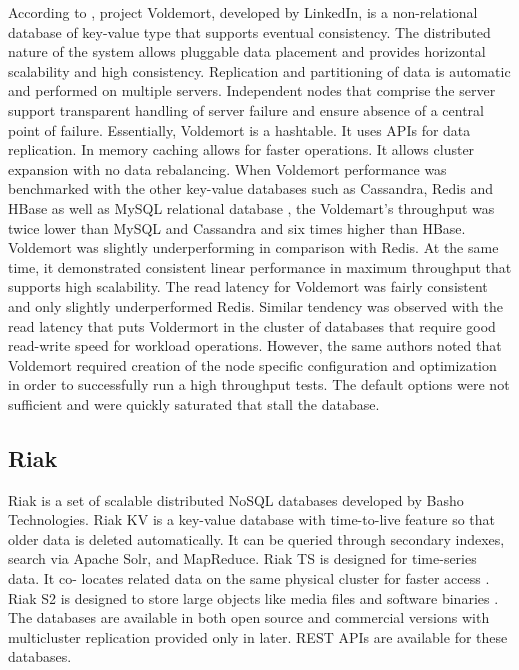     According to \cite{www-voldemort}, project Voldemort, developed
     by LinkedIn, is a non-relational database of key-value type that
     supports eventual consistency. The distributed nature of the
     system allows pluggable data placement and provides horizontal
     scalability and high consistency. Replication and partitioning of
     data is automatic and performed on multiple servers. Independent
     nodes that comprise the server support transparent handling of
     server failure and ensure absence of a central point of
     failure. Essentially, Voldemort is a hashtable. It uses APIs for
     data replication. In memory caching allows for faster
     operations. It allows cluster expansion with no data rebalancing.
     When Voldemort performance was benchmarked with the other
     key-value databases such as Cassandra, Redis and HBase as well as
     MySQL relational database \cite{rabl-sadoghi-jacobsen-2012}, the
     Voldemart's throughput was twice lower than MySQL and Cassandra
     and six times higher than HBase. Voldemort was slightly
     underperforming in comparison with Redis. At the same time, it
     demonstrated consistent linear performance in maximum throughput
     that supports high scalability. The read latency for Voldemort
     was fairly consistent and only slightly underperformed
     Redis. Similar tendency was observed with the read latency that
     puts Voldermort in the cluster of databases that require good
     read-write speed for workload operations. However, the same
     authors noted that Voldemort required creation of the node
     specific configuration and optimization in order to successfully
     run a high throughput tests. The default options were not
     sufficient and were quickly saturated that stall the database.
     
\subsection{ Riak}

     Riak is a set of scalable distributed NoSQL databases developed
     by Basho Technologies. Riak KV is a key-value \cite{www-riak-kv}
     database with time-to-live feature so that older data is deleted
     automatically.  It can be queried through secondary indexes,
     search via Apache Solr, and MapReduce. Riak TS is designed for
     time-series data. It co- locates related data on the same
     physical cluster for faster access \cite{www-riak-ts}. Riak S2
     is designed to store large objects like media files and software
     binaries \cite{www-riak-s2}. The databases are available in both
     open source and commercial versions with multicluster replication
     provided only in later. REST APIs are available for these
     databases.

